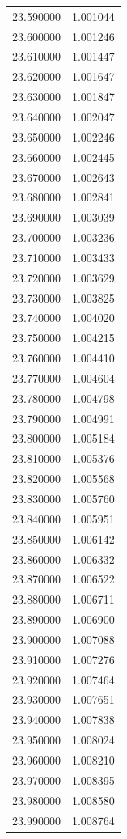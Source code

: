 \begin{tabular}{rr}
23.590000 & 1.001044 \\
23.600000 & 1.001246 \\
23.610000 & 1.001447 \\
23.620000 & 1.001647 \\
23.630000 & 1.001847 \\
23.640000 & 1.002047 \\
23.650000 & 1.002246 \\
23.660000 & 1.002445 \\
23.670000 & 1.002643 \\
23.680000 & 1.002841 \\
23.690000 & 1.003039 \\
23.700000 & 1.003236 \\
23.710000 & 1.003433 \\
23.720000 & 1.003629 \\
23.730000 & 1.003825 \\
23.740000 & 1.004020 \\
23.750000 & 1.004215 \\
23.760000 & 1.004410 \\
23.770000 & 1.004604 \\
23.780000 & 1.004798 \\
23.790000 & 1.004991 \\
23.800000 & 1.005184 \\
23.810000 & 1.005376 \\
23.820000 & 1.005568 \\
23.830000 & 1.005760 \\
23.840000 & 1.005951 \\
23.850000 & 1.006142 \\
23.860000 & 1.006332 \\
23.870000 & 1.006522 \\
23.880000 & 1.006711 \\
23.890000 & 1.006900 \\
23.900000 & 1.007088 \\
23.910000 & 1.007276 \\
23.920000 & 1.007464 \\
23.930000 & 1.007651 \\
23.940000 & 1.007838 \\
23.950000 & 1.008024 \\
23.960000 & 1.008210 \\
23.970000 & 1.008395 \\
23.980000 & 1.008580 \\
23.990000 & 1.008764 \\

\end{tabular}
